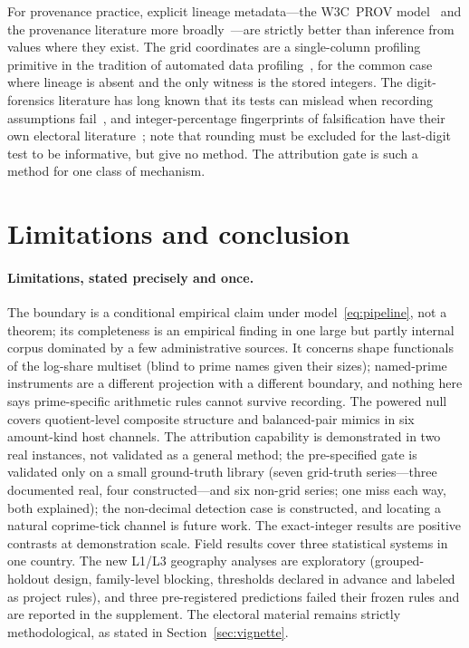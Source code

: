 \documentclass[12pt]{article}
\begin{document}
For provenance practice, explicit lineage metadata---the W3C~PROV
model~\citep{provdm2013} and the provenance literature more
broadly~\citep{buneman2001,simmhan2005,cheney2009}---are strictly better
than inference from values where they exist. The grid coordinates are
a single-column profiling primitive in the tradition of automated data
profiling~\citep{abedjan2015,tane1999,metanome2015,hellerstein2008}, for the
common case where lineage is absent and the only witness is the stored
integers. The digit-forensics literature has long known that its tests can
mislead when recording assumptions fail~\citep{deckert2011,mebane2011,
klimek2012,lacasa2019}, and integer-percentage fingerprints of falsification
have their own electoral literature~\citep{kobak2016}; \citet{beberscacco2012} note that rounding must be
excluded for the last-digit test to be informative, but give no method. The
attribution gate is such a method for one class of mechanism.

\section{Limitations and conclusion}
\label{sec:limits}

\paragraph{Limitations, stated precisely and once.}
The boundary is a conditional empirical claim under
model~\eqref{eq:pipeline}, not a theorem; its completeness is an empirical
finding in one large but partly internal corpus dominated by a few
administrative sources. It concerns shape functionals of the log-share
multiset (blind to prime names given their sizes); named-prime instruments
are a different projection with a different boundary, and nothing here says
prime-specific arithmetic rules cannot survive recording. The powered null covers quotient-level composite
structure and balanced-pair mimics in six amount-kind host channels. The
attribution capability is demonstrated in two real instances, not validated
as a general method; the pre-specified gate is validated only on a small
ground-truth library (seven grid-truth series---three documented real, four
constructed---and six non-grid series; one miss each way, both explained); the non-decimal detection case is constructed, and
locating a natural coprime-tick channel is future work. The exact-integer results are
positive contrasts at demonstration scale. Field results cover three
statistical systems in one country. The new L1/L3 geography analyses are
exploratory (grouped-holdout design, family-level blocking, thresholds
declared in advance and labeled as project rules), and three pre-registered
predictions failed their frozen rules and are reported in the supplement. The
electoral material remains strictly methodological, as stated in
Section~\ref{sec:vignette}.
\end{document}
